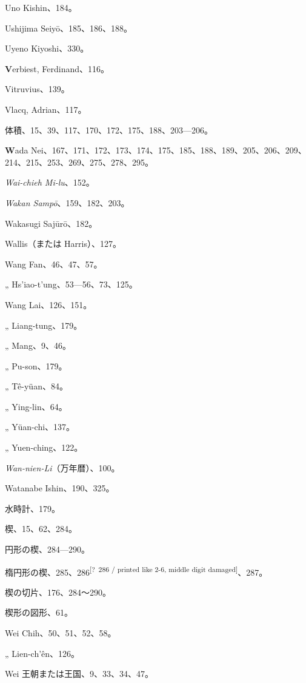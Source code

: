 \documentclass[11pt]{article}
\newcommand{\unclear}[1]{\textsuperscript{[?~#1]}}
\begin{document}
Uno Kishin、184。\par
Ushijima Seiyō、185、186、188。\par
Uyeno Kiyoshi、330。\par
\medskip
\textbf{V}erbiest, Ferdinand、116。\par
Vitruvius、139。\par
Vlacq, Adrian、117。\par
体積、15、39、117、170、172、175、188、203—206。\par
\medskip
\textbf{W}ada Nei、167、171、172、173、174、175、185、188、189、205、206、209、214、215、253、269、275、278、295。\par
\emph{Wai-chieh Mi-lu}、152。\par
\emph{Wakan Sampō}、159、182、203。\par
Wakasugi Sajūrō、182。\par
Wallis（または Harris）、127。\par
Wang Fan、46、47、57。\par
\quad „ Hs'iao-t'ung、53—56、73、125。\par
Wang Lai、126、151。\par
\quad „ Liang-tung、179。\par
\quad „ Mang、9、46。\par
\quad „ Pu-son、179。\par
\quad „ Tê-yüan、84。\par
\quad „ Ying-lin、64。\par
\quad „ Yüan-chi、137。\par
\quad „ Yuen-ching、122。\par
\emph{Wan-nien-Li}（万年暦）、100。\par
Watanabe Ishin、190、325。\par
水時計、179。\par
楔、15、62、284。\par
円形の楔、284—290。\par
楕円形の楔、285、286\unclear{286 / printed like 2-6, middle digit damaged}、287。\par
楔の切片、176、284～290。\par
楔形の図形、61。\par
Wei Chih、50、51、52、58。\par
\quad „ Lien-ch'ên、126。\par
Wei 王朝または王国、9、33、34、47。\par
\end{document}
